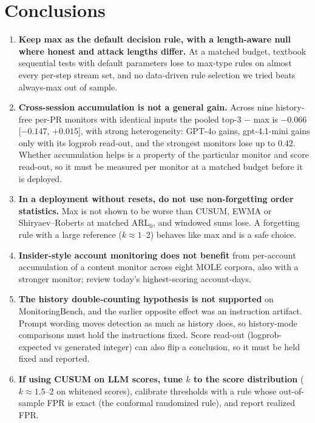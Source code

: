 \documentclass[11pt]{article}
\newcommand{\m}{\ensuremath{-}}
\begin{document}
\section{Conclusions}
\begin{enumerate}
\item \textbf{Keep max as the default decision rule, with a length-aware null where honest and attack lengths differ.} At a matched budget, textbook sequential tests with default parameters lose to max-type rules on almost every per-step stream set, and no data-driven rule selection we tried beats always-max out of sample.
\item \textbf{Cross-session accumulation is not a general gain.} Across nine history-free per-PR monitors with identical inputs the pooled top-3 $-$ max is $\m0.066$ [$\m0.147$, $+0.015$], with strong heterogeneity: GPT-4o gains, gpt-4.1-mini gains only with its logprob read-out, and the strongest monitors lose up to 0.42. Whether accumulation helps is a property of the particular monitor and score read-out, so it must be measured per monitor at a matched budget before it is deployed.
\item \textbf{In a deployment without resets, do not use non-forgetting order statistics.} Max is not shown to be worse than CUSUM, EWMA or Shiryaev--Roberts at matched ARL$_0$, and windowed sums lose. A forgetting rule with a large reference ($k\approx1$--2) behaves like max and is a safe choice.
\item \textbf{Insider-style account monitoring does not benefit} from per-account accumulation of a content monitor across eight MOLE corpora, also with a stronger monitor; review today's highest-scoring account-days.
\item \textbf{The history double-counting hypothesis is not supported} on MonitoringBench, and the earlier opposite effect was an instruction artifact. Prompt wording moves detection as much as history does, so history-mode comparisons must hold the instructions fixed. Score read-out (logprob-expected vs generated integer) can also flip a conclusion, so it must be held fixed and reported.
\item \textbf{If using CUSUM on LLM scores, tune $k$ to the score distribution} ($k\approx1.5$--2 on whitened scores), calibrate thresholds with a rule whose out-of-sample FPR is exact (the conformal randomized rule), and report realized FPR.
\end{enumerate}
\end{document}
